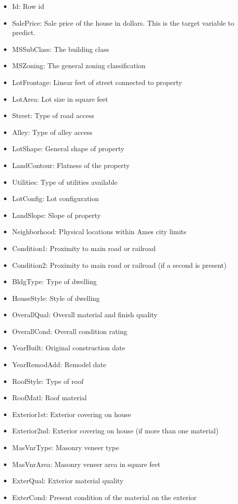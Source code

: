 \documentclass[sigconf]{acmart}
\begin{document}
	\begin{itemize}
	\item Id: Row id
	\item SalePrice: Sale price of the house in dollars. This is the target variable to predict.
	\item MSSubClass: The building class
	\item MSZoning: The general zoning classification
	\item LotFrontage: Linear feet of street connected to property
	\item LotArea: Lot size in square feet
	\item Street: Type of road access
	\item Alley: Type of alley access
	\item LotShape: General shape of property
	\item LandContour: Flatness of the property
	\item Utilities: Type of utilities available
	\item LotConfig: Lot configuration
	\item LandSlope: Slope of property
	\item Neighborhood: Physical locations within Ames city limits
	\item Condition1: Proximity to main road or railroad
	\item Condition2: Proximity to main road or railroad (if a second is present)
	\item BldgType: Type of dwelling
	\item HouseStyle: Style of dwelling
	\item OverallQual: Overall material and finish quality
	\item OverallCond: Overall condition rating
	\item YearBuilt: Original construction date
	\item YearRemodAdd: Remodel date
	\item RoofStyle: Type of roof
	\item RoofMatl: Roof material
	\item Exterior1st: Exterior covering on house
	\item Exterior2nd: Exterior covering on house (if more than one material)
	\item MasVnrType: Masonry veneer type
	\item MasVnrArea: Masonry veneer area in square feet
	\item ExterQual: Exterior material quality
	\item ExterCond: Present condition of the material on the exterior

\end{itemize}
\end{document}
